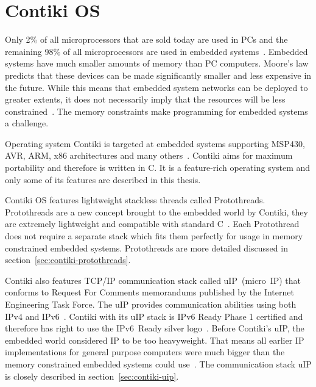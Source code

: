 
\chapter{Contiki OS}
Only 2\% of all microprocessors that are sold today are used in PCs and the remaining 98\%
of all microprocessors are used in embedded systems~\cite{thesis-programming}.
Embedded systems have much smaller amounts of memory than PC computers.
Moore's law predicts that these devices
can be made significantly smaller and less expensive in the future.
While this means that embedded system networks can
be deployed to greater extents, it does not necessarily imply
that the resources will be less constrained~\cite{paper-contiki}.
The memory constraints make programming for embedded systems a challenge.

Operating system Contiki is targeted at embedded systems supporting MSP430, AVR, ARM, x86
architectures and many others~\cite{contiki-docs}.
Contiki aims for maximum portability and therefore is written in C.
It is a feature-rich operating system and
only some of its features are described in this thesis.

Contiki OS features lightweight stackless threads called Protothreads.
Protothreads are a new concept brought to the embedded world by Contiki,
they are extremely lightweight and compatible with standard C~\cite{paper-protothreads}.
Each Protothread does not require a separate stack which fits them perfectly
for usage in memory constrained embedded systems.
Protothreads are more detailed discussed in section~\ref{sec:contiki-protothreads}.

Contiki also features TCP/IP communication stack called uIP~(micro~IP)
that conforms to Request For Comments memorandums published by the Internet Engineering Task Force.
The uIP provides communication abilities using both IPv4 and IPv6~\cite{contiki-docs}.
Contiki with its uIP stack is IPv6 Ready Phase 1 certified
and therefore has right to use the IPv6~Ready silver logo~\cite{ipv6ready-db}.
Before Contiki's uIP, the embedded world considered IP to be too heavyweight.
That means all earlier IP implementations for general purpose computers
were much bigger than the memory constrained embedded systems could use~\cite{interconnecting}.
The communication stack uIP is closely described in section~\ref{sec:contiki-uip}.


